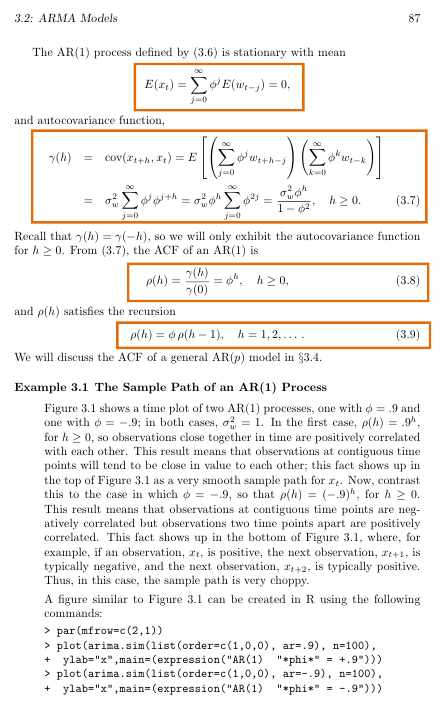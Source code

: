 \documentclass{article}
\begin{document}
\newpage\includegraphics[width=.9\textwidth]{shumway4}
\end{document}
